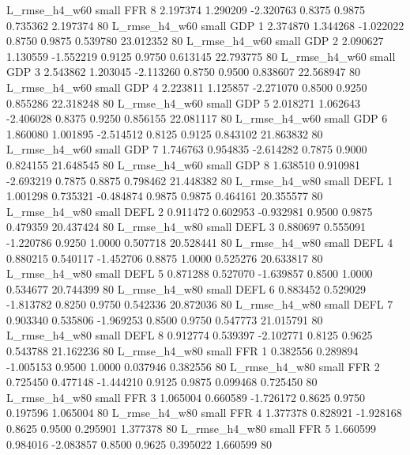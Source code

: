  L_rmse_h4_w60      small      FFR                 8 2.197374 1.290209 -2.320763 0.8375 0.9875  0.735362    2.197374 80
 L_rmse_h4_w60      small      GDP                 1 2.374870 1.344268 -1.022022 0.8750 0.9875  0.539780   23.012352 80
 L_rmse_h4_w60      small      GDP                 2 2.090627 1.130559 -1.552219 0.9125 0.9750  0.613145   22.793775 80
 L_rmse_h4_w60      small      GDP                 3 2.543862 1.203045 -2.113260 0.8750 0.9500  0.838607   22.568947 80
 L_rmse_h4_w60      small      GDP                 4 2.223811 1.125857 -2.271070 0.8500 0.9250  0.855286   22.318248 80
 L_rmse_h4_w60      small      GDP                 5 2.018271 1.062643 -2.406028 0.8375 0.9250  0.856155   22.081117 80
 L_rmse_h4_w60      small      GDP                 6 1.860080 1.001895 -2.514512 0.8125 0.9125  0.843102   21.863832 80
 L_rmse_h4_w60      small      GDP                 7 1.746763 0.954835 -2.614282 0.7875 0.9000  0.824155   21.648545 80
 L_rmse_h4_w60      small      GDP                 8 1.638510 0.910981 -2.693219 0.7875 0.8875  0.798462   21.448382 80
 L_rmse_h4_w80      small     DEFL                 1 1.001298 0.735321 -0.484874 0.9875 0.9875  0.464161   20.355577 80
 L_rmse_h4_w80      small     DEFL                 2 0.911472 0.602953 -0.932981 0.9500 0.9875  0.479359   20.437424 80
 L_rmse_h4_w80      small     DEFL                 3 0.880697 0.555091 -1.220786 0.9250 1.0000  0.507718   20.528441 80
 L_rmse_h4_w80      small     DEFL                 4 0.880215 0.540117 -1.452706 0.8875 1.0000  0.525276   20.633817 80
 L_rmse_h4_w80      small     DEFL                 5 0.871288 0.527070 -1.639857 0.8500 1.0000  0.534677   20.744399 80
 L_rmse_h4_w80      small     DEFL                 6 0.883452 0.529029 -1.813782 0.8250 0.9750  0.542336   20.872036 80
 L_rmse_h4_w80      small     DEFL                 7 0.903340 0.535806 -1.969253 0.8500 0.9750  0.547773   21.015791 80
 L_rmse_h4_w80      small     DEFL                 8 0.912774 0.539397 -2.102771 0.8125 0.9625  0.543788   21.162236 80
 L_rmse_h4_w80      small      FFR                 1 0.382556 0.289894 -1.005153 0.9500 1.0000  0.037946    0.382556 80
 L_rmse_h4_w80      small      FFR                 2 0.725450 0.477148 -1.444210 0.9125 0.9875  0.099468    0.725450 80
 L_rmse_h4_w80      small      FFR                 3 1.065004 0.660589 -1.726172 0.8625 0.9750  0.197596    1.065004 80
 L_rmse_h4_w80      small      FFR                 4 1.377378 0.828921 -1.928168 0.8625 0.9500  0.295901    1.377378 80
 L_rmse_h4_w80      small      FFR                 5 1.660599 0.984016 -2.083857 0.8500 0.9625  0.395022    1.660599 80
